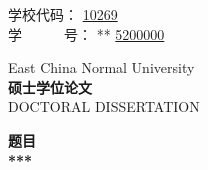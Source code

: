 \pagestyle{empty}


\hskip 4.6cm {{ 学校代码： {\large  \underline{10269\hspace{1.4cm}}}}}\\
\hskip 4.6cm  {{ 学~~~~~~号： {\large \ifpeerview ***\hspace{1.82cm} \else \underline{5200000}\fi}}}

\vskip 2cm

\begin{center}
\end{center}

\begin{center}
{  East China Normal University} \\
{\bf\songti{} 硕士学位论文} \\
{  DOCTORAL DISSERTATION}
\end{center}

\vskip 1.5cm

\begin{center}
{\bf\songti{} 题目}\\[1em]
{\bf\songti{} ***}
\end{center}


